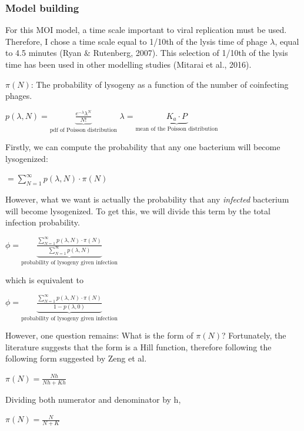 \documentclass{article}
\begin{document}
\subsubsection{Model building}
For this MOI model, a time scale important to viral replication must be used. Therefore, I chose a time scale equal to 1/10th of the lysis time of phage $\lambda$, equal to 4.5 minutes (Ryan $\&$ Rutenberg, 2007). This selection of 1/10th of the lysis time has been used in other modelling studies (Mitarai et al., 2016). 

$\pi(N)$: The probability of lysogeny as a function of the number of coinfecting phages. 

\begin{center}$
p(\lambda, N) = \underbrace{\frac{{e^{ - \lambda } \lambda ^N}}{{N!}}}_{\text{pdf of Poisson distribution}}$
$\lambda = \underbrace{K_a \cdot P}_{\text{mean of the Poisson distribution}}$
\end{center} 

Firstly, we can compute the probability that any one bacterium will become lysogenized:
\begin{center}
$=\sum_{N=1}^{\infty}{p(\lambda, N) \cdot \pi(N)}$
\end{center}

However, what we want is actually the probability that any \emph{infected} bacterium will become lysogenized. To get this, we will divide this term by the total infection probability. 
\begin{center}
$
\phi = \underbrace{\frac{\sum_{N=1}^{\infty}{p(\lambda, N) \cdot \pi(N)}}{\sum_{N=1}^{\infty}p(\lambda, N) }}_{\text{probability of lysogeny given infection}}$
\end{center}

which is equivalent to 
\begin{center}
$\phi = \underbrace{\frac{\sum_{N=1}^{\infty}{p(\lambda, N) \cdot \pi(N)}}{1-p(\lambda, 0)}}_{\text{probability of lysogeny given infection}}$
\end{center}

However, one question remains: What is the form of $\pi(N)$? Fortunately, the literature suggests that the form is a Hill function, therefore following the following form suggested by Zeng et al. 

\begin{center}
$\pi(N) = \frac{Nh}{Nh + Kh}$
\end{center}
Dividing both numerator and denominator by h,
\begin{center}
$\pi(N) = \frac{N}{N + K}$
\end{center}
\end{document}
